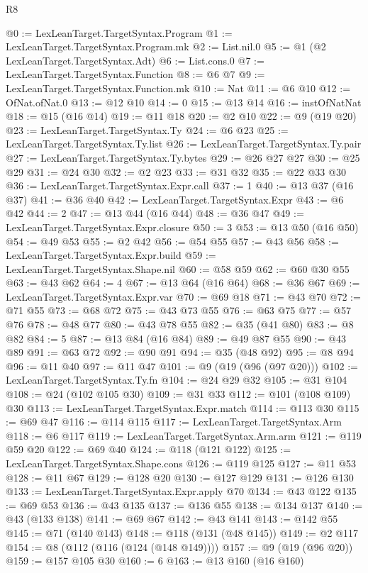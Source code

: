 \begin{lexlean}{R8}
\begin{coremodule}
{{{{{{{{{{{{{{{{{{{{{{{{{{{{{{{{{{{{{{{{{{{{{@0 := LexLeanTarget.TargetSyntax.Program
@1 := LexLeanTarget.TargetSyntax.Program.mk
@2 := List.nil.{0}
@5 := @1 (@2 LexLeanTarget.TargetSyntax.Adt)
@6 := List.cons.{0}
@7 := LexLeanTarget.TargetSyntax.Function
@8 := @6 @7
@9 := LexLeanTarget.TargetSyntax.Function.mk
@10 := Nat
@11 := @6 @10
@12 := OfNat.ofNat.{0}
@13 := @12 @10
@14 := 0
@15 := @13 @14
@16 := instOfNatNat
@18 := @15 (@16 @14)
@19 := @11 @18
@20 := @2 @10
@22 := @9 (@19 @20)
@23 := LexLeanTarget.TargetSyntax.Ty
@24 := @6 @23
@25 := LexLeanTarget.TargetSyntax.Ty.list
@26 := LexLeanTarget.TargetSyntax.Ty.pair
@27 := LexLeanTarget.TargetSyntax.Ty.bytes
@29 := @26 @27 @27
@30 := @25 @29
@31 := @24 @30
@32 := @2 @23
@33 := @31 @32
@35 := @22 @33 @30
@36 := LexLeanTarget.TargetSyntax.Expr.call
@37 := 1
@40 := @13 @37 (@16 @37)
@41 := @36 @40
@42 := LexLeanTarget.TargetSyntax.Expr
@43 := @6 @42
@44 := 2
@47 := @13 @44 (@16 @44)
@48 := @36 @47
@49 := LexLeanTarget.TargetSyntax.Expr.closure
@50 := 3
@53 := @13 @50 (@16 @50)
@54 := @49 @53
@55 := @2 @42
@56 := @54 @55
@57 := @43 @56
@58 := LexLeanTarget.TargetSyntax.Expr.build
@59 := LexLeanTarget.TargetSyntax.Shape.nil
@60 := @58 @59
@62 := @60 @30 @55
@63 := @43 @62
@64 := 4
@67 := @13 @64 (@16 @64)
@68 := @36 @67
@69 := LexLeanTarget.TargetSyntax.Expr.var
@70 := @69 @18
@71 := @43 @70
@72 := @71 @55
@73 := @68 @72
@75 := @43 @73 @55
@76 := @63 @75
@77 := @57 @76
@78 := @48 @77
@80 := @43 @78 @55
@82 := @35 (@41 @80)
@83 := @8 @82
@84 := 5
@87 := @13 @84 (@16 @84)
@89 := @49 @87 @55
@90 := @43 @89
@91 := @63 @72
@92 := @90 @91
@94 := @35 (@48 @92)
@95 := @8 @94
@96 := @11 @40
@97 := @11 @47
@101 := @9 (@19 (@96 (@97 @20)))
@102 := LexLeanTarget.TargetSyntax.Ty.fn
@104 := @24 @29 @32
@105 := @31 @104
@108 := @24 (@102 @105 @30)
@109 := @31 @33
@112 := @101 (@108 @109) @30
@113 := LexLeanTarget.TargetSyntax.Expr.match
@114 := @113 @30
@115 := @69 @47
@116 := @114 @115
@117 := LexLeanTarget.TargetSyntax.Arm
@118 := @6 @117
@119 := LexLeanTarget.TargetSyntax.Arm.arm
@121 := @119 @59 @20
@122 := @69 @40
@124 := @118 (@121 @122)
@125 := LexLeanTarget.TargetSyntax.Shape.cons
@126 := @119 @125
@127 := @11 @53
@128 := @11 @67
@129 := @128 @20
@130 := @127 @129
@131 := @126 @130
@133 := LexLeanTarget.TargetSyntax.Expr.apply @70
@134 := @43 @122
@135 := @69 @53
@136 := @43 @135
@137 := @136 @55
@138 := @134 @137
@140 := @43 (@133 @138)
@141 := @69 @67
@142 := @43 @141
@143 := @142 @55
@145 := @71 (@140 @143)
@148 := @118 (@131 (@48 @145))
@149 := @2 @117
@154 := @8 (@112 (@116 (@124 (@148 @149))))
@157 := @9 (@19 (@96 @20))
@159 := @157 @105 @30
@160 := 6
@163 := @13 @160 (@16 @160)
}}}}}}}}}}}}}}}}}}}}}}}}}}}}}}}}}}}}}}}}}}}}}
\end{coremodule}
\end{lexlean}
